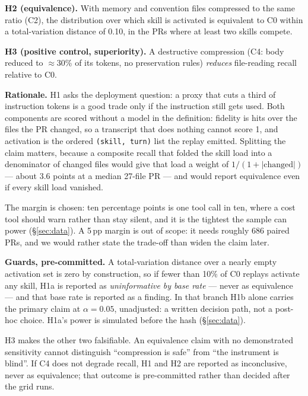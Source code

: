 \documentclass[10pt,conference]{IEEEtran}
\begin{document}
\textbf{H2 (equivalence).} With memory and convention files compressed to the same ratio (C2), the distribution over which skill is activated is equivalent to C0 within a total-variation distance of 0.10, in the PRs where at least two skills compete.

\textbf{H3 (positive control, superiority).} A destructive compression (C4: body reduced to $\approx$30\% of its tokens, no preservation rules) \emph{reduces} file-reading recall relative to C0.

\textbf{Rationale.} H1 asks the deployment question: a proxy that cuts a third of instruction tokens is a good trade only if the instruction still gets used. Both components are scored without a model in the definition: fidelity is hits over the files the PR changed, so a transcript that does nothing cannot score 1, and activation is the ordered \texttt{(skill, turn)} list the replay emitted. Splitting the claim matters, because a composite recall that folded the skill load into a denominator of changed files would give that load a weight of $1/(1+|\mathrm{changed}|)$ --- about 3.6 points at a median 27-file PR --- and would report equivalence even if every skill load vanished.

The margin is chosen: ten percentage points is one tool call in ten, where a cost tool should warn rather than stay silent, and it is the tightest the sample can power (\S\ref{sec:data}). A 5\,pp margin is out of scope: it needs roughly 686 paired PRs, and we would rather state the trade-off than widen the claim later.

\textbf{Guards, pre-committed.} A total-variation distance over a nearly empty activation set is zero by construction, so if fewer than 10\% of C0 replays activate any skill, H1a is reported as \emph{uninformative by base rate} --- never as equivalence --- and that base rate is reported as a finding. In that branch H1b alone carries the primary claim at $\alpha=0.05$, unadjusted: a written decision path, not a post-hoc choice. H1a's power is simulated before the hash (\S\ref{sec:data}).

H3 makes the other two falsifiable. An equivalence claim with no demonstrated sensitivity cannot distinguish ``compression is safe'' from ``the instrument is blind''. If C4 does not degrade recall, H1 and H2 are reported as inconclusive, never as equivalence; that outcome is pre-committed rather than decided after the grid runs.
\end{document}
